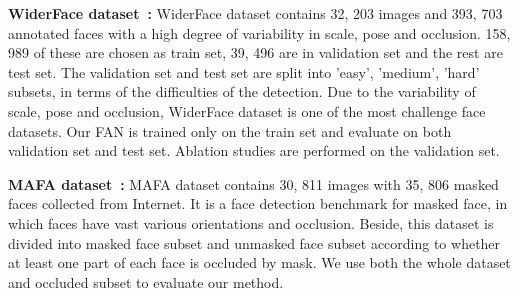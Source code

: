 \documentclass[10pt,twocolumn,letterpaper]{article}
\begin{document}
\textbf{WiderFace dataset~\cite{yang2016wider}:} WiderFace dataset contains 32, 203 images and 393, 703 annotated faces with a high degree of variability in scale, pose and occlusion. 158, 989 of these are chosen as train set, 39, 496 are in validation set and the rest are test set. The validation set and test set are split into 'easy', 'medium', 'hard' subsets, in terms of the difficulties of the detection. Due to the variability of scale, pose and occlusion, WiderFace dataset is one of the most challenge face datasets. Our FAN is trained only on the train set and evaluate on both validation set and test set. Ablation studies are performed on the validation set.

\textbf{MAFA dataset~\cite{Ge_2017_CVPR}:} MAFA dataset contains 30, 811 images with 35, 806 masked faces collected from Internet. It is a face detection benchmark for masked face, in which faces have vast various orientations and occlusion. Beside, this dataset is divided into masked face subset and unmasked face subset according to whether at least one part of each face is occluded by mask. We use both the whole dataset and occluded subset to evaluate our method.




\end{document}
